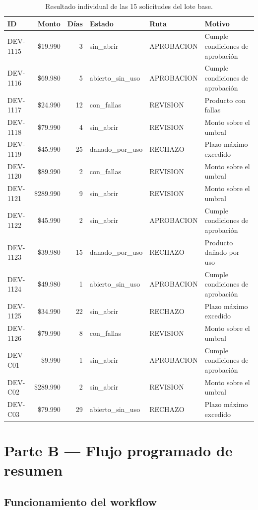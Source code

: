 \documentclass[10pt,a4paper]{article}
\begin{document}
\begin{table}[H]
\centering
\scriptsize
\begin{tabular}{|l|r|r|l|l|l|}
\hline
ID & Monto & Días & Estado & Ruta & Motivo \\
\hline
DEV-1115 & \$19.990 & 3 & sin\_abrir & APROBACION & Cumple condiciones de aprobación \\
DEV-1116 & \$69.980 & 5 & abierto\_sin\_uso & APROBACION & Cumple condiciones de aprobación \\
DEV-1117 & \$24.990 & 12 & con\_fallas & REVISION & Producto con fallas \\
DEV-1118 & \$79.990 & 4 & sin\_abrir & REVISION & Monto sobre el umbral \\
DEV-1119 & \$45.990 & 25 & danado\_por\_uso & RECHAZO & Plazo máximo excedido \\
DEV-1120 & \$89.990 & 2 & con\_fallas & REVISION & Monto sobre el umbral \\
DEV-1121 & \$289.990 & 9 & sin\_abrir & REVISION & Monto sobre el umbral \\
DEV-1122 & \$45.990 & 2 & sin\_abrir & APROBACION & Cumple condiciones de aprobación \\
DEV-1123 & \$39.980 & 15 & danado\_por\_uso & RECHAZO & Producto dañado por uso \\
DEV-1124 & \$49.980 & 1 & abierto\_sin\_uso & APROBACION & Cumple condiciones de aprobación \\
DEV-1125 & \$34.990 & 22 & sin\_abrir & RECHAZO & Plazo máximo excedido \\
DEV-1126 & \$79.990 & 8 & con\_fallas & REVISION & Monto sobre el umbral \\
DEV-C01 & \$9.990 & 1 & sin\_abrir & APROBACION & Cumple condiciones de aprobación \\
DEV-C02 & \$289.990 & 2 & sin\_abrir & REVISION & Monto sobre el umbral \\
DEV-C03 & \$79.990 & 29 & abierto\_sin\_uso & RECHAZO & Plazo máximo excedido \\
\hline
\end{tabular}
\caption{Resultado individual de las 15 solicitudes del lote base.}
\label{tab:detalle15}
\end{table}

\section{Parte B --- Flujo programado de resumen}

\subsection{Funcionamiento del workflow}
\end{document}
